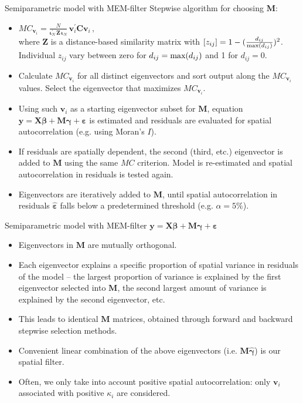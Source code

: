 \documentclass{beamer}
\begin{document}
\begin{frame}{Semiparametric model with MEM-filter}
\small 
Stepwise algorithm for choosing $\bm{M}$:
\medskip
\begin{itemize}
    \item $\textit{MC}_{\bm{v}_i} = \frac{N}{\bm{\iota}_N^{\prime} \, \bm{Z} \, \bm{\iota}_N } \, \bm{v}_i^{\prime} \bm{C} \bm{v}_i \, ,$\\ \smallskip
    where $\bm{Z}$ is a distance-based similarity matrix with $[z_{ij}] = 1 - (\tfrac{d_{ij}}{\textnormal{max}(d_{ij})})^2$. Individual $z_{ij}$ vary between zero for $d_{ij} = \textnormal{max}(d_{ij})$ and 1 for $d_{ij} = 0$.
    \smallskip
    \item Calculate $\textit{MC}_{\bm{v}_i}$ for all distinct eigenvectors and sort output along the $\textit{MC}_{\bm{v}_i}$ values. Select the eigenvector that maximizes $\textit{MC}_{\bm{v}_i}$. 
    \smallskip 
    \item Using such $\bm{v}_i$ as a starting eigenvector subset for $\bm{M}$, equation $\bm{y} = \bm{X \beta } + \bm{M \gamma} + \bm{\varepsilon}$ is estimated and residuals are evaluated for spatial autocorrelation (e.g. using Moran's $I$). 
    \smallskip
    \item If residuals are spatially dependent, the second (third, etc.) eigenvector is added to $\bm{M}$ using the same $\textit{MC}$ criterion. Model is re-estimated and spatial autocorrelation in residuals is tested again. \smallskip 
    \item Eigenvectors are iteratively added to $\bm{M}$, until spatial autocorrelation in residuals $\bm{\hat{\varepsilon}}$ falls below a predetermined threshold (e.g. $\alpha = 5 \%$).
\end{itemize}
\end{frame}
\begin{frame}{Semiparametric model with MEM-filter}
$\bm{y} = \bm{X \beta } + \bm{M \gamma} + \bm{\varepsilon}$
\medskip
\begin{itemize}
    \item Eigenvectors in $\bm{M}$ are mutually orthogonal.
    \smallskip
    \item Each eigenvector explains a specific proportion of spatial variance in residuals of the model -- the largest proportion of variance is explained by the first eigenvector selected into $\bm{M}$, the second largest amount of variance is explained by the second eigenvector, etc. 
    \smallskip
    \item This leads to identical $\bm{M}$ matrices, obtained through forward and backward stepwise selection methods. 
    \smallskip
    \item Convenient linear combination of the above eigenvectors (i.e. $\bm{M\hat{\gamma}}$) is our spatial filter. 
    \smallskip
    \item Often, we only take into account positive spatial autocorrelation: only $\bm{v}_i$ associated with positive $\kappa_i$ are considered.
\end{itemize}
\end{frame}
\end{document}
